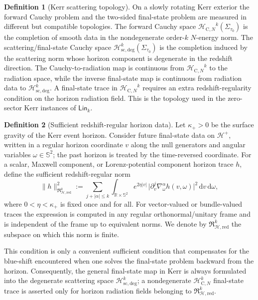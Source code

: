 \documentclass[11pt]{article}
\numberwithin{equation}{section}
\theoremstyle{plain}
\theoremstyle{definition}
\newtheorem{definition}{Definition}[section]
\theoremstyle{remark}
\newcommand{\dd}{\mathrm{d}}
\newcommand{\Lin}{\mathsf{Lin}}
\newcommand{\Hcauchy}{\mathcal H_{\mathrm{C},N}}
\newcommand{\Hscatt}{\mathcal H_{\mathrm{sc,deg}}}
\begin{document}
\begin{definition}[Kerr scattering topology]\label{def:kerr-scattering-topology}
On a slowly rotating Kerr exterior the forward Cauchy problem and the two-sided final-state problem are measured in different but compatible topologies. The forward Cauchy space ${\Hcauchy}^{k}(\Sigma_{\tau_0})$ is the completion of smooth data in the nondegenerate order-$k$ $N$-energy norm. The scattering/final-state Cauchy space $\Hscatt^{k}(\Sigma_{\tau_0})$ is the completion induced by the scattering norm whose horizon component is degenerate in the redshift direction. The Cauchy-to-radiation map is continuous from ${\Hcauchy}^{k}$ to the radiation space, while the inverse final-state map is continuous from radiation data to $\Hscatt^{k}$. A final-state trace in ${\Hcauchy}^{k}$ requires an extra redshift-regularity condition on the horizon radiation field. This is the topology used in the zero-sector Kerr instances of $\Lin_k$.
\end{definition}

\begin{definition}[Sufficient redshift-regular horizon data]\label{def:redshift-regular-horizon}
Let $\kappa_+>0$ be the surface gravity of the Kerr event horizon. Consider future final-state data on $\mathcal H^+$, written in a regular horizon coordinate $v$ along the null generators and angular variables $\omega\in\mathbb S^2$; the past horizon is treated by the time-reversed coordinate. For a scalar, Maxwell component, or Lorenz-potential component horizon trace $h$, define the sufficient redshift-regular norm
\begin{equation}
\|h\|_{\mathfrak R_{\mathcal H,\mathrm{red}}^{k}}^2
:=
\sum_{j+|\alpha|\le k}
\int_{\mathbb R\times\mathbb S^2}
 e^{2\eta |v|}\,
\bigl|\partial_v^j\nabla_{\omega}^{\alpha}h(v,\omega)\bigr|^2\,\dd v\,\dd\omega,
\end{equation}
where $0<\eta<\kappa_+$ is fixed once and for all. For vector-valued or bundle-valued traces the expression is computed in any regular orthonormal/unitary frame and is independent of the frame up to equivalent norms. We denote by $\mathfrak R_{\mathcal H,\mathrm{red}}^{k}$ the subspace on which this norm is finite.

This condition is only a convenient sufficient condition that compensates for the blue-shift encountered when one solves the final-state problem backward from the horizon. Consequently, the general final-state map in Kerr is always formulated into the degenerate scattering space $\Hscatt^k$; a nondegenerate $\Hcauchy^k$ final-state trace is asserted only for horizon radiation fields belonging to $\mathfrak R_{\mathcal H,\mathrm{red}}^{k}$.
\end{definition}
\end{document}
